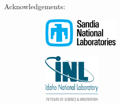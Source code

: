 \begin{frame}
  Acknowledgements:
  \begin{figure}
    \centering
    \begin{subfigure}{0.48\textwidth}
      \centering
      \includegraphics[width=0.4\textwidth]{conclusions/figures/SNL}
    \end{subfigure}
    \begin{subfigure}{0.48\textwidth}
      \centering
      \includegraphics[width=0.3\textwidth]{conclusions/figures/INL}
    \end{subfigure}
  \end{figure}
\end{frame}
